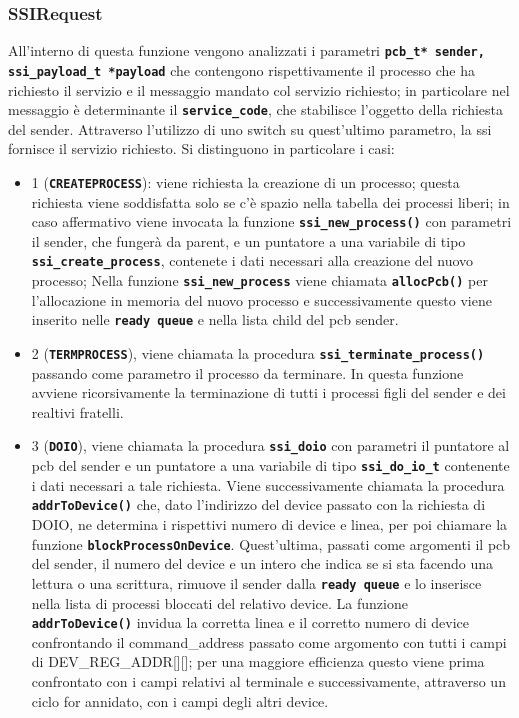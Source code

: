 \documentclass{article}
\begin{document}
\subsubsection{SSIRequest}
All'interno di questa funzione vengono analizzati i parametri \texttt{\textbf{pcb\_t* sender, ssi\_payload\_t *payload}} che contengono rispettivamente il processo che ha richiesto il servizio e il messaggio mandato col servizio richiesto; in particolare nel messaggio è determinante il \texttt{\textbf{service\_code}}, che stabilisce l'oggetto della richiesta del sender. Attraverso l'utilizzo di uno switch su quest'ultimo parametro, la ssi fornisce il servizio richiesto.
Si distinguono in particolare i casi:
\begin{itemize}
	\item 1 (\texttt{\textbf{CREATEPROCESS}}): viene richiesta la creazione di un processo; questa richiesta viene soddisfatta solo se c'è spazio nella tabella dei processi liberi; in caso affermativo viene invocata la funzione \texttt{\textbf{ssi\_new\_process()}} con parametri il sender, che fungerà da parent, e un puntatore a una variabile di tipo \texttt{\textbf{ssi\_create\_process}}, contenete i dati necessari alla creazione del nuovo processo; 
   Nella funzione \texttt{\textbf{ssi\_new\_process}} viene chiamata \texttt{\textbf{allocPcb()}} per l'allocazione in memoria del nuovo processo e successivamente questo viene inserito nelle \texttt{\textbf{ready queue}} e nella lista child del pcb sender.
   

    \item 2 (\texttt{\textbf{TERMPROCESS}}), viene chiamata la procedura \texttt{\textbf{ssi\_terminate\_process()}} passando come parametro il processo da terminare.
    In questa funzione avviene ricorsivamente la terminazione di tutti i processi figli del sender e dei realtivi fratelli.

    \item 3 (\texttt{\textbf{DOIO}}), viene chiamata la procedura \texttt{\textbf{ssi\_doio}} con parametri il puntatore al pcb del sender e un puntatore a una variabile di tipo \texttt{\textbf{ssi\_do\_io\_t}} contenente i dati necessari a tale richiesta.
    Viene successivamente chiamata la procedura \texttt{\textbf{addrToDevice()}} che, dato l'indirizzo del device passato con la richiesta di DOIO, ne determina i rispettivi numero di device e linea, per poi chiamare la funzione \texttt{\textbf{blockProcessOnDevice}}.
    Quest'ultima, passati come argomenti il pcb del sender, il numero del device e un intero che indica se si sta facendo una lettura o una scrittura, rimuove il sender dalla \texttt{\textbf{ready queue}} e lo inserisce nella lista di processi bloccati del relativo device.
    La funzione \texttt{\textbf{addrToDevice()}} invidua la corretta linea e il corretto numero di device confrontando il command\_address passato come argomento con tutti i campi di DEV\_REG\_ADDR[][]; per una maggiore efficienza questo viene prima confrontato con i campi relativi al terminale e successivamente, attraverso un ciclo for annidato, con i campi degli altri device.



\end{itemize}
\end{document}
